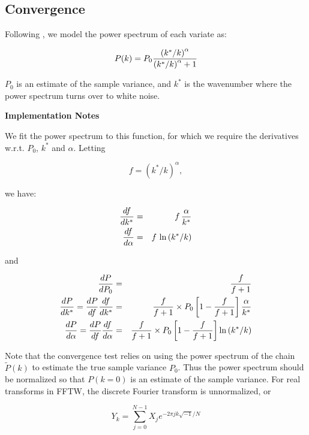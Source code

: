 \def\fac{{\left(k^*/k\right)^\alpha}}

\subsection{Convergence}

Following \cite{Dunkley2008}, we model the power spectrum of each variate as:

\begin{equation}
P(k) = P_0 {{\fac\over{\fac + 1}}}
\end{equation}

$P_0$ is an estimate of the sample variance, and $k^*$ is the
wavenumber where the power spectrum turns over to white noise.

{\bf Implementation Notes}

We fit the power spectrum to this function, for which we require the
derivatives w.r.t. $P_0$, $k^*$ and $\alpha$.  Letting

\begin{equation}
f = \fac,
\end{equation}

we have:

\begin{eqnarray}\nonumber
{df}\over{dk^*} &=& f\,{{\alpha}\over{k^*}}\\\nonumber
{df}\over{d\alpha} &=& f\,\ln{(k^*/k)}
\end{eqnarray}

and 

\begin{eqnarray}\nonumber
{{dP}\over{dP_0}} &=& {{f}\over{f+1}}\\\nonumber
{{dP}\over{dk^*}} = {{dP}\over{df}}{{df}\over{dk^*}} &=& {{f}\over{f+1}}\times P_0\left[1 - {{f}\over{f+1}}\right]{{\alpha}\over{k^*}}\\\nonumber
{{dP}\over{d\alpha}} = {{dP}\over{df}}{{df}\over{d\alpha}} &=& {{f}\over{f+1}}\times P_0\left[1 - {{f}\over{f+1}}\right]{\ln{(k^*/k)}}
\end{eqnarray}

Note that the convergence test relies on using the power spectrum of
the chain $\tilde{P}(k)$ to estimate the true sample variance $P_0$.
Thus the power spectrum should be normalized so that $P(k=0)$ is an
estimate of the sample variance.  For real transforms in FFTW, the
discrete Fourier transform is unnormalized, or

\begin{equation}
Y_k = \sum^{N-1}_{j=0}{X_j e^{-2\pi jk\sqrt{-1}/N}}
\end{equation}

